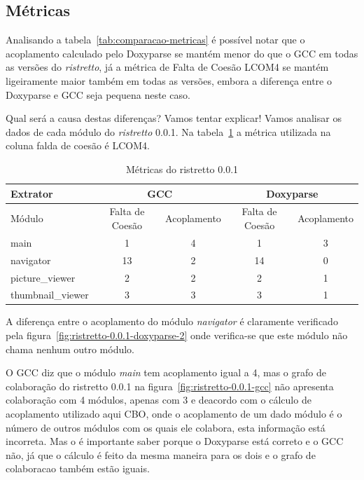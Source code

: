 \subsection{Métricas}

Analisando a tabela~\ref{tab:comparacao-metricas}  é possível notar que o
acoplamento calculado pelo Doxyparse se mantém menor do que o GCC em todas as
versões do {\it ristretto}, já a métrica de Falta de Coesão LCOM4 se mantém
ligeiramente maior também em todas as versões, embora a diferença entre o
Doxyparse e GCC seja pequena neste caso.

Qual será a causa destas diferenças? Vamos tentar explicar! Vamos analisar os
dados de cada módulo do {\it ristretto} 0.0.1. Na
tabela~\ref{tab:comparacao-metricas-ristretto-0.0.1} a métrica utilizada na
coluna falda de coesão é LCOM4.

\begin{table}
\caption{Métricas do ristretto 0.0.1}
\centering
\begin{tabular}{| l | c c | c c |}
\hline
Extrator          & \multicolumn{2}{|c|}{GCC}        & \multicolumn{2}{|c|}{Doxyparse} \\
\hline
Módulo            & Falta de Coesão & Acoplamento    & Falta de Coesão & Acoplamento   \\
\hline
main              & 1               & 4              & 1               & 3             \\
navigator         & 13              & 2              & 14              & 0             \\
picture\_viewer   & 2               & 2              & 2               & 1             \\
thumbnail\_viewer & 3               & 3              & 3               & 1             \\
\hline
\end{tabular}
\label{tab:comparacao-metricas-ristretto-0.0.1}
\end{table}

A diferença entre o acoplamento do módulo {\it navigator} é claramente
verificado pela figura~\ref{fig:ristretto-0.0.1-doxyparse-2} onde verifica-se
que este módulo não chama nenhum outro módulo.

O GCC diz que o módulo {\it main} tem acoplamento igual a 4, mas o grafo de
colaboração do ristretto 0.0.1 na figura~\ref{fig:ristretto-0.0.1-gcc} não
apresenta colaboração com 4 módulos, apenas com 3 e deacordo com o cálculo de
acoplamento utilizado aqui CBO, onde o acoplamento de um dado módulo é o número
de outros módulos com os quais ele colabora, esta informação está incorreta.
Mas o é importante saber porque o Doxyparse está correto e o GCC não, já que o
cálculo é feito da mesma maneira para os dois e o grafo de colaboracao também
estão iguais.

